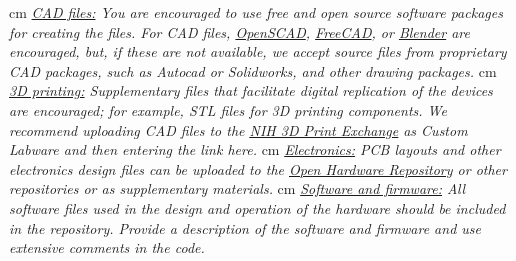\documentclass[11pt, letterpaper]{article}
\begin{document}
%
 cm
\noindent
\textit{\underline{CAD files:} You are encouraged to use free and open source software packages for creating the files. For CAD files, \href{http://www.openscad.org/}{OpenSCAD}, \href{http://www.freecadweb.org/}{FreeCAD}, or \href{https://www.blender.org/}{Blender} are encouraged, but, if these are not available, we accept source files from proprietary CAD packages, such as Autocad or Solidworks, and other drawing packages.} 
 cm
\noindent
\textit{\underline{3D printing:} Supplementary files that facilitate digital replication of the devices are encouraged;  for example, STL files for 3D printing components. We recommend uploading CAD files to the \href{http://3dprint.nih.gov/}{\underline{NIH 3D Print Exchange}} as Custom Labware and then entering the link here.} 
 cm
\noindent
\textit{\underline{Electronics:} PCB layouts and other electronics design files can be uploaded to the \href{http://www.ohwr.org/}{\underline{Open Hardware Repository}} or other repositories or as supplementary materials.} 
 cm
\noindent
\textit{\underline{Software and firmware:} All software files used in the design and operation of the hardware should be included in the repository. Provide a description of the software and firmware and use extensive comments in the code.}
\end{document}
